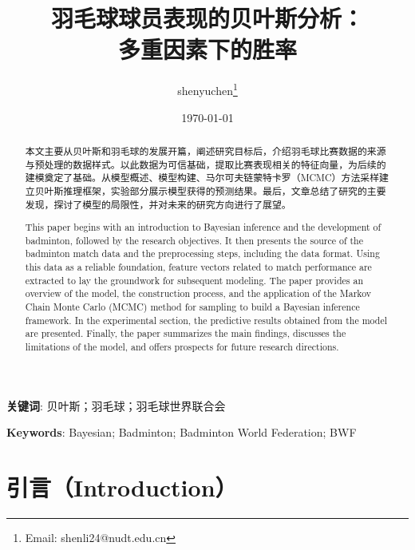 \documentclass[12pt]{article}
\begin{document}
\title{羽毛球球员表现的贝叶斯分析：\\ 多重因素下的胜率}
\date{\today}

\author[1,2]{shenyuchen\thanks{Email: shenli24@nudt.edu.cn}}




\maketitle

\renewcommand{\abstractname}{摘要}
\begin{abstract}
	本文主要从贝叶斯和羽毛球的发展开篇，阐述研究目标后，介绍羽毛球比赛数据的来源与预处理的数据样式。以此数据为可信基础，提取比赛表现相关的特征向量，为后续的建模奠定了基础。从模型概述、模型构建、马尔可夫链蒙特卡罗（MCMC）方法采样建立贝叶斯推理框架，实验部分展示模型获得的预测结果。最后，文章总结了研究的主要发现，探讨了模型的局限性，并对未来的研究方向进行了展望。
\end{abstract}

\textbf{关键词}: 贝叶斯；羽毛球；羽毛球世界联合会

\renewcommand{\abstractname}{Abstract}
\begin{abstract}
	This paper begins with an introduction to Bayesian inference and the development of badminton, followed by the research objectives. It then presents the source of the badminton match data and the preprocessing steps, including the data format. Using this data as a reliable foundation, feature vectors related to match performance are extracted to lay the groundwork for subsequent modeling. The paper provides an overview of the model, the construction process, and the application of the Markov Chain Monte Carlo (MCMC) method for sampling to build a Bayesian inference framework. In the experimental section, the predictive results obtained from the model are presented. Finally, the paper summarizes the main findings, discusses the limitations of the model, and offers prospects for future research directions.
\end{abstract}

\textbf{Keywords}: Bayesian; Badminton; Badminton World Federation; BWF


\section{引言（Introduction）}
\end{document}
